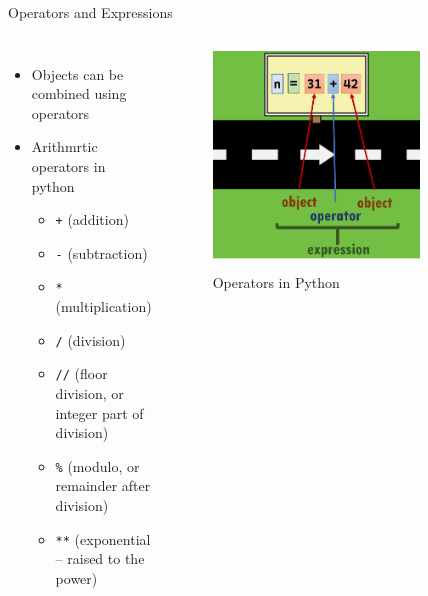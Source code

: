 \begin{frame}{Operators and Expressions}
    \begin{columns}
        \begin{itemize}
            \item Objects can be combined using operators
            \item Arithmrtic operators in python 
            \begin{itemize}
            \item \texttt{+} (addition)
            \item \texttt{-} (subtraction)
            \item \texttt{*} (multiplication)
            \item \texttt{/} (division)
            \item \texttt{//} (floor division, or integer part of division)
            \item \texttt{\%} (modulo, or remainder after division)
            \item \texttt{**} (exponential -- raised to the power)
            \end{itemize}
                    \end{itemize}
        \begin{figure}
            \centering
            \includegraphics[width=0.8\textwidth]{pics/operator.png}
            \caption{Operators in Python}
        \end{figure}
    \end{columns}
\end{frame}
